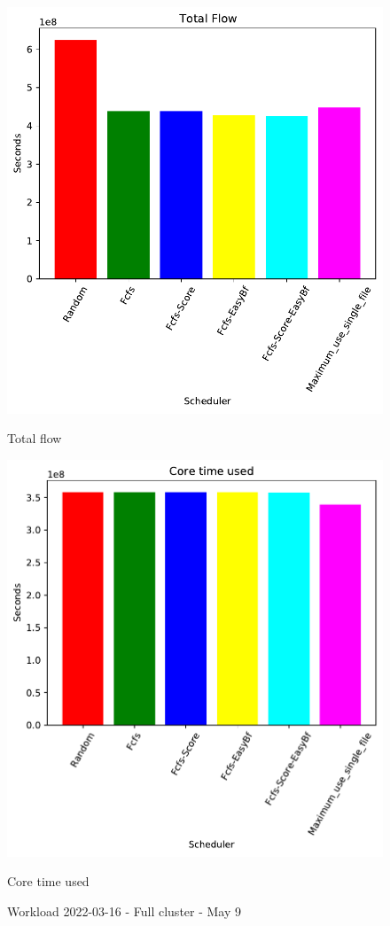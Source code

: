 \begin{figure}[H]
	\begin{minipage}[b]{0.5\linewidth}\centering\includegraphics[width=1\linewidth]{MBSS/plot/2022-03-16_Total_flow450_128_32_256_4_1024.pdf}\caption{Total flow}\vspace{4ex}\end{minipage}
	\begin{minipage}[b]{0.5\linewidth}\centering\includegraphics[width=1\linewidth]{MBSS/plot/2022-03-16_Core_time_used450_128_32_256_4_1024.pdf}\caption{Core time used}\vspace{4ex}\end{minipage}\caption{Workload 2022-03-16 - Full cluster - May 9}\end{figure}
